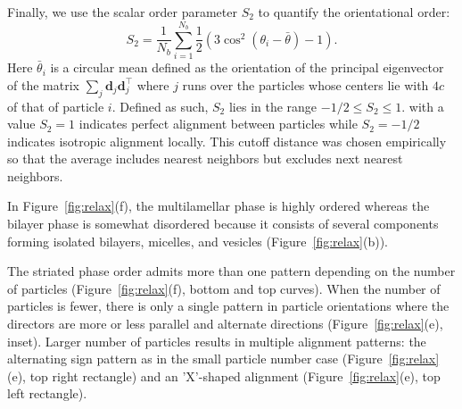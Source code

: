 \documentclass[prb,preprint,showpacs,preprintnumbers,amsmath,amssymb,longbibliography]{revtex4-1}
\newcommand{\dd}{\mathbf{d}}
\begin{document}
Finally, we use the scalar order parameter $S_2$
to quantify the orientational order\cite{Selinger2016}:
\begin{equation}
  \label{eq:S2}
S_2 = \frac{1}{N_b} \sum_{i=1}^{N_b} \frac{1}{2}(3\cos^2(\theta_i - \bar \theta) - 1).
\end{equation}
Here $\bar \theta_i$ is a circular mean defined as the orientation of the
principal eigenvector of the matrix
$\sum_{j} \dd_j\dd_j^\top$ where $j$ runs over the particles
whose centers lie with $4c$ of that of particle $i$. 
Defined as such, $S_2$ lies in the range $-1/2 \le S_2 \le 1$.
with a value $S_2 = 1$ indicates perfect alignment between particles
while $S_2=-1/2$ indicates isotropic alignment locally.
This cutoff distance was chosen empirically
so that the average includes nearest neighbors
but excludes next nearest neighbors.

In Figure~\ref{fig:relax}(f), the multilamellar phase is highly ordered 
whereas the bilayer phase is somewhat
disordered because it consists of several components forming isolated
bilayers, micelles, and vesicles (Figure~\ref{fig:relax}(b)).

The striated phase order admits more than one pattern
depending on the number of particles (Figure~\ref{fig:relax}(f), bottom and top curves).
When the number of particles is fewer, there is only a
single pattern in particle orientations where the directors are more or
less parallel and alternate directions (Figure~\ref{fig:relax}(e),
inset). Larger number of particles results in multiple alignment patterns:
the alternating sign pattern as in the small particle number case
(Figure~\ref{fig:relax}(e), top right rectangle) and an 'X'-shaped
alignment (Figure~\ref{fig:relax}(e), top left rectangle).

\end{document}
